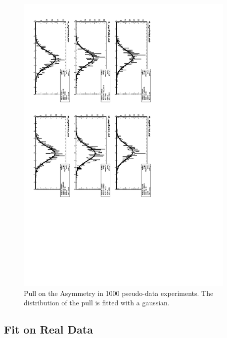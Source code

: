 \begin{figure}[htb]
  \begin{center}
\includegraphics*[angle=90,width=0.95\textwidth]{pullasyTot.pdf}
    \caption{\label{fig:toyasym_pull}Pull on the Asymmetry in 1000 pseudo-data experiments. The distribution of the pull is fitted with a gaussian.}
  \end{center}
\end{figure}

\subsection{Fit on Real Data}


